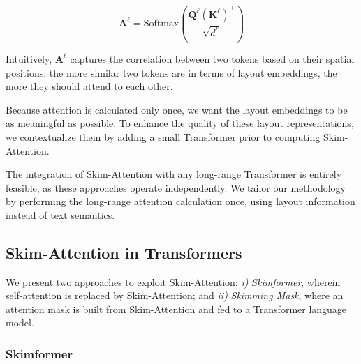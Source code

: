 \begin{equation}
\label{eq:chapter3-skim-attention-matrix}
    \bm{A}^{\ell} = \text{Softmax}\left(\dfrac{\bm{Q}^{\ell}\left(\bm{K}^{\ell}\right)^\top}{\sqrt{d^{\ell}}}\right)
\end{equation}

Intuitively, $\bm{A}^{\ell}$ captures the correlation between two tokens based on their spatial positions: the more similar two tokens are in terms of layout embeddings, the more they should attend to each other. 

Because attention is calculated only once, we want the layout embeddings to be as meaningful as possible. To enhance the quality of these layout representations, we contextualize them by adding a small Transformer prior to computing Skim-Attention. 

The integration of Skim-Attention with any long-range Transformer is entirely feasible, as these approaches operate independently. We tailor our methodology by performing the long-range attention calculation once, using layout information instead of text semantics.

\subsection{Skim-Attention in Transformers}

We present two approaches to exploit Skim-Attention:
\emph{i)} \textit{Skimformer}, wherein self-attention is replaced by Skim-Attention; and \emph{ii)} \textit{Skimming Mask}, where an attention mask is built from Skim-Attention and fed to a Transformer language model.

\subsubsection{Skimformer}

